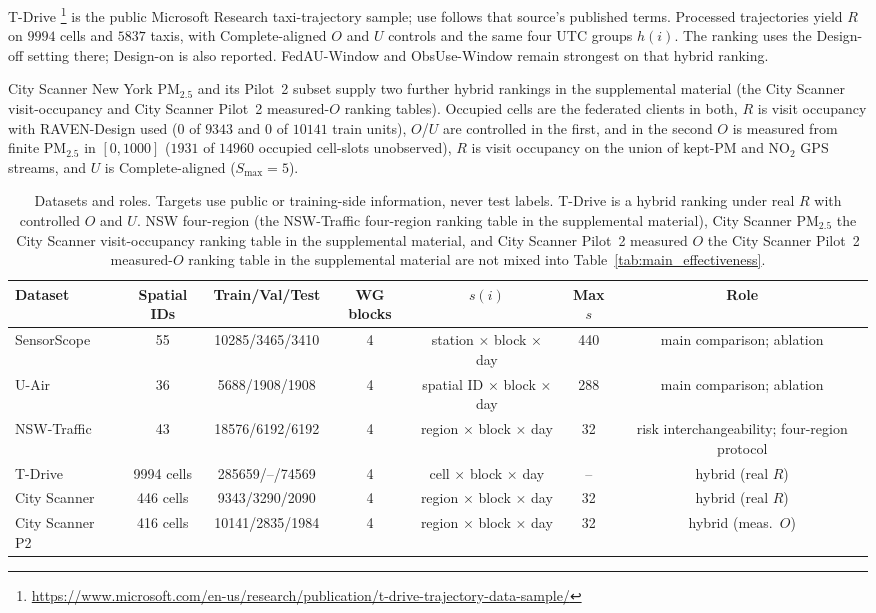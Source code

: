 \documentclass[letterpaper,journal]{IEEEtran}
\begin{document}
T-Drive
\cite{yuan2010tdrive}\footnote{\url{https://www.microsoft.com/en-us/research/publication/t-drive-trajectory-data-sample/}}
is the public Microsoft Research taxi-trajectory sample; use follows that
source's published terms.  Processed trajectories yield $R$ on $9994$
cells and $5837$ taxis, with Complete-aligned $O$ and $U$ controls and
the same four UTC groups $h(i)$.  The ranking uses the Design-off setting
there; Design-on is also reported.  FedAU-Window and ObsUse-Window remain strongest
on that hybrid ranking.

City Scanner New York {PM}$_{2.5}$ and its Pilot~2 subset supply two further
hybrid rankings in the supplemental material (the City Scanner visit-occupancy
and City Scanner Pilot~2 measured-$O$ ranking tables).  Occupied cells are the
federated clients in both, $R$ is visit occupancy with RAVEN-Design used ($0$
of $9343$ and $0$ of $10141$ train units), $O$/$U$ are controlled in the first,
and in the second $O$ is measured from finite {PM}$_{2.5}$ in $[0,1000]$
($1931$ of $14960$ occupied cell-slots unobserved), $R$ is visit occupancy on
the union of kept-{PM} and {NO}$_2$ GPS streams, and $U$ is Complete-aligned
($S_{\max}=5$).

\begin{table}[t]
\centering
\caption{Datasets and roles.  Targets use public or training-side
information, never test labels.  T-Drive is a hybrid ranking under real
$R$ with controlled $O$ and $U$.  NSW four-region
(the NSW-Traffic four-region ranking table in the supplemental material), City Scanner {PM}$_{2.5}$
the City Scanner visit-occupancy ranking table in the supplemental material, and City Scanner Pilot~2 measured
$O$ the City Scanner Pilot~2 measured-$O$ ranking table in the supplemental material are not mixed into
Table~\ref{tab:main_effectiveness}.}
\label{tab:datasets}
\scriptsize
\setlength{\tabcolsep}{3.2pt}
\begin{tabular*}{\textwidth}{@{\extracolsep{\fill}}lcccccc}
\toprule
Dataset & Spatial IDs & Train/Val/Test & WG blocks &
$s(i)$ & Max $s$ & Role\\
\midrule
SensorScope~\cite{ingelrest2010sensorscope} & 55 & 10285/3465/3410 & 4 &
station $\times$ block $\times$ day & 440 & main comparison; ablation\\
U-Air~\cite{zheng2013uair} & 36 & 5688/1908/1908 & 4 &
spatial ID $\times$ block $\times$ day & 288 & main comparison; ablation\\
NSW-Traffic~\cite{tfnsw2024traffic} & 43 & 18576/6192/6192 & 4 &
region $\times$ block $\times$ day & 32 & risk interchangeability; four-region protocol\\
T-Drive~\cite{yuan2010tdrive} & 9994 cells & 285659/--/74569 & 4 &
cell $\times$ block $\times$ day & -- & hybrid (real $R$)\\
City Scanner~\cite{wang2023cityscanner} & 446 cells & 9343/3290/2090 & 4 &
region $\times$ block $\times$ day & 32 & hybrid (real $R$)\\
City Scanner P2 & 416 cells & 10141/2835/1984 & 4 &
region $\times$ block $\times$ day & 32 & hybrid (meas.\ $O$)\\
\bottomrule
\end{tabular*}
\end{table}
\end{document}
